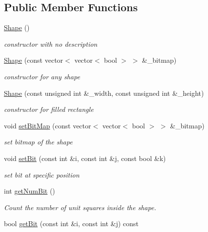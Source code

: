 \subsection*{Public Member Functions}
\begin{DoxyCompactItemize}
\item 
\mbox{\hyperlink{class_shape_aaa8d87171e65e0d8ba3c5459978992a7}{Shape}} ()
\begin{DoxyCompactList}\small\item\em constructor with no description \end{DoxyCompactList}\item 
\mbox{\hyperlink{class_shape_a8b614d73e9091d05a3e8b5a119bf509a}{Shape}} (const vector$<$ vector$<$ bool $>$ $>$ \&\+\_\+bitmap)
\begin{DoxyCompactList}\small\item\em constructor for any shape \end{DoxyCompactList}\item 
\mbox{\hyperlink{class_shape_a37e0820a3b0346435b5fa57761480b32}{Shape}} (const unsigned int \&\+\_\+width, const unsigned int \&\+\_\+height)
\begin{DoxyCompactList}\small\item\em constructor for filled rectangle \end{DoxyCompactList}\item 
void \mbox{\hyperlink{class_shape_ad539a5441a4aaa95349fd1bfc76043a1}{set\+Bit\+Map}} (const vector$<$ vector$<$ bool $>$ $>$ \&\+\_\+bitmap)
\begin{DoxyCompactList}\small\item\em set bitmap of the shape \end{DoxyCompactList}\item 
void \mbox{\hyperlink{class_shape_af3b265335667167ced81b3226b07dcb0}{set\+Bit}} (const int \&i, const int \&j, const bool \&k)
\begin{DoxyCompactList}\small\item\em set bit at specific position \end{DoxyCompactList}\item 
int \mbox{\hyperlink{class_shape_a87f7e888ab40590dd3e4f73e13514152}{get\+Num\+Bit}} ()
\begin{DoxyCompactList}\small\item\em Count the number of unit squares inside the shape. \end{DoxyCompactList}\item 
bool \mbox{\hyperlink{class_shape_ab486d732a49d49cbbc4fadf1f23c379e}{get\+Bit}} (const int \&i, const int \&j) const

\end{DoxyCompactItemize}
